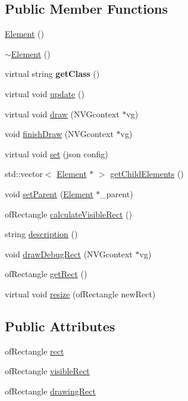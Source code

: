 \subsection*{Public Member Functions}
\begin{DoxyCompactItemize}
\item 
\hyperlink{class_element_ab0d0e20be9a36ae676202db753faeec9}{Element} ()
\item 
\hyperlink{class_element_a13d54ba9c08b6bec651402f1c2bb002c}{$\sim$\+Element} ()
\item 
\mbox{\label{class_element_a41f73faaa553135f856f86919ca076bc}} 
virtual string {\bfseries get\+Class} ()
\item 
virtual void \hyperlink{class_element_a35de04f6ab79440bb44083d8b300b87d}{update} ()
\item 
virtual void \hyperlink{class_element_a37c9abed5bec87d9ce0a5e74fb872f34}{draw} (N\+V\+Gcontext $\ast$vg)
\item 
void \hyperlink{class_element_a8b134081551b47cd3dabdd34355fa222}{finish\+Draw} (N\+V\+Gcontext $\ast$vg)
\item 
virtual void \hyperlink{class_element_af89dcf0a470753cf1fecd8556a802c63}{set} (json config)
\item 
std\+::vector$<$ \hyperlink{class_element}{Element} $\ast$ $>$ \hyperlink{class_element_af48e62b627817b2fb3f1d7ab120820af}{get\+Child\+Elements} ()
\item 
void \hyperlink{class_element_a613fd8cd5c12461d534170a63cb69395}{set\+Parent} (\hyperlink{class_element}{Element} $\ast$\+\_\+parent)
\item 
of\+Rectangle \hyperlink{class_element_a2dd48722ec3678bf52a9693dc0c11d13}{calculate\+Visible\+Rect} ()
\item 
string \hyperlink{class_element_a8523a191a02721936d5fe6a0e77c0120}{description} ()
\item 
void \hyperlink{class_element_a6a3627e9bc7d6331b07f0cac75735388}{draw\+Debug\+Rect} (N\+V\+Gcontext $\ast$vg)
\item 
of\+Rectangle \hyperlink{class_element_afc58e4696e16d692b53c8ece12387496}{get\+Rect} ()
\item 
virtual void \hyperlink{class_element_a9d78e1489e80f210a8f5cc9e5d5b07d3}{resize} (of\+Rectangle new\+Rect)
\end{DoxyCompactItemize}
\subsection*{Public Attributes}
\begin{DoxyCompactItemize}
\item 
of\+Rectangle \hyperlink{class_element_a8ec1c9655a75cf8791fd30ba7e995878}{rect}
\item 
of\+Rectangle \hyperlink{class_element_affbc750717256c94422f99bbef8e39bf}{visible\+Rect}
\item 
of\+Rectangle \hyperlink{class_element_a497056184edcfc580df57aac565e94f8}{drawing\+Rect}
\end{DoxyCompactItemize}
